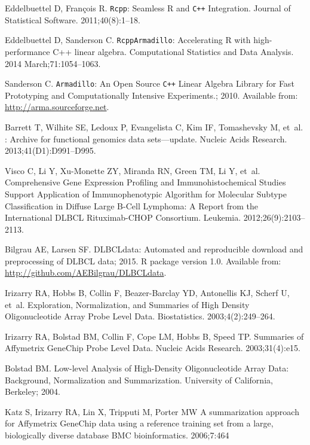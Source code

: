\documentclass[10pt,letterpaper]{article}
\newcommand{\R}{\textsf{R}}
\begin{document}
\begin{thebibliography}{10}
Eddelbuettel D, Fran\c{c}ois R.
\newblock \texttt{Rcpp}: Seamless {\R} and \texttt{C++} Integration.
\newblock Journal of Statistical Software. 2011;40(8):1--18.

Eddelbuettel D, Sanderson C.
\newblock \texttt{RcppArmadillo}: Accelerating \textsf{R} with high-performance
  \textsf{{C}++} linear algebra.
\newblock Computational Statistics and Data Analysis. 2014 March;71:1054--1063.

Sanderson C. \texttt{Armadillo}: An Open Source \texttt{C++} Linear Algebra
  Library for Fast Prototyping and Computationally Intensive Experiments.;
  2010.
\newblock Available from: \url{http://arma.sourceforge.net}.

Barrett T, Wilhite SE, Ledoux P, Evangelista C, Kim IF, Tomashevsky M, et~al.
: {A}rchive for functional genomics data sets—update.
\newblock Nucleic Acids Research. 2013;41(D1):D991--D995.

Visco C, Li Y, Xu-Monette ZY, Miranda RN, Green TM, Li Y, et~al.
\newblock Comprehensive Gene Expression Profiling and Immunohistochemical
  Studies Support Application of Immunophenotypic Algorithm for Molecular
  Subtype Classification in Diffuse Large {B}-Cell Lymphoma: A Report from the
  International {DLBCL} Rituximab-{CHOP} Consortium.
\newblock Leukemia. 2012;26(9):2103--2113.

Bilgrau AE, Larsen SF. DLBCLdata: Automated and reproducible download and
  preprocessing of DLBCL data; 2015.
\newblock R package version 1.0.
\newblock Available from: \url{http://github.com/AEBilgrau/DLBCLdata}.

Irizarry RA, Hobbs B, Collin F, Beazer-Barclay YD, Antonellis KJ, Scherf U,
  et~al.
\newblock Exploration, Normalization, and Summaries of High Density
  Oligonucleotide Array Probe Level Data.
\newblock Biostatistics. 2003;4(2):249--264.

Irizarry RA, Bolstad BM, Collin F, Cope LM, Hobbs B, Speed TP.
\newblock Summaries of {Affymetrix GeneChip} Probe Level Data.
\newblock Nucleic Acids Research. 2003;31(4):e15.

Bolstad BM.
\newblock Low-level Analysis of High-Density Oligonucleotide Array Data:
  Background, Normalization and Summarization.
\newblock University of California, Berkeley; 2004.

Katz S, Irizarry RA, Lin X, Tripputi M, Porter MW
\newblock A summarization approach for Affymetrix GeneChip data using a reference training set from a large, biologically diverse database
\newblock BMC bioinformatics. 2006;7:464


\end{thebibliography}
\end{document}
